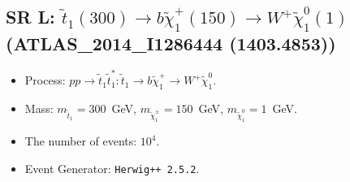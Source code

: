     
\subsection{SR L: $\tilde t_1(300) \to b \tilde \chi_1^+(150) \to W^+ \tilde \chi_1^0(1)$ (ATLAS\_2014\_I1286444 (1403.4853))} 


        \begin{itemize}
        \item  Process: $pp \to \tilde t_1 \tilde t_1^*: \tilde t_1 \to b \tilde \chi_1^+ \to W^+ \tilde \chi_1^0$.
        \item  Mass: $m_{\tilde t_1} = 300$~GeV, $m_{\tilde \chi_1^\pm} = 150$~GeV, $m_{\tilde \chi_1^0} = 1$~GeV.
        \item  The number of events: $10^4$.
        \item  Event Generator: {\tt Herwig++ 2.5.2}.    
        \end{itemize}    
    

